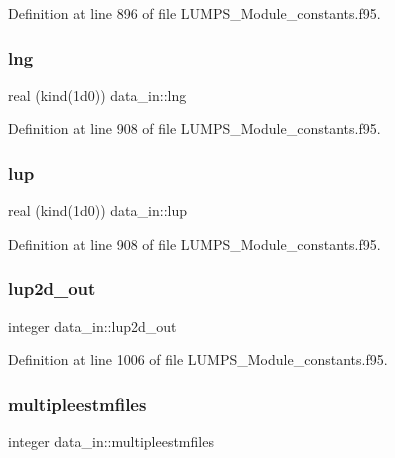 Definition at line 896 of file L\+U\+M\+P\+S\+\_\+\+Module\+\_\+constants.\+f95.

\mbox{\label{namespacedata__in_a3604b533bd06593307e185fbbee27efb}} 
\subsubsection{\texorpdfstring{lng}{lng}}
{\footnotesize\ttfamily real (kind(1d0)) data\+\_\+in\+::lng}



Definition at line 908 of file L\+U\+M\+P\+S\+\_\+\+Module\+\_\+constants.\+f95.

\mbox{\label{namespacedata__in_a5a2c23ecc11fe337a954cca86be6e0ce}} 
\subsubsection{\texorpdfstring{lup}{lup}}
{\footnotesize\ttfamily real (kind(1d0)) data\+\_\+in\+::lup}



Definition at line 908 of file L\+U\+M\+P\+S\+\_\+\+Module\+\_\+constants.\+f95.

\mbox{\label{namespacedata__in_a7a7382928accd01035de817c6e632b86}} 
\subsubsection{\texorpdfstring{lup2d\+\_\+out}{lup2d\_out}}
{\footnotesize\ttfamily integer data\+\_\+in\+::lup2d\+\_\+out}



Definition at line 1006 of file L\+U\+M\+P\+S\+\_\+\+Module\+\_\+constants.\+f95.

\mbox{\label{namespacedata__in_ad49de355a2aafe1ffbc40d2e91a12d87}} 
\subsubsection{\texorpdfstring{multipleestmfiles}{multipleestmfiles}}
{\footnotesize\ttfamily integer data\+\_\+in\+::multipleestmfiles}



